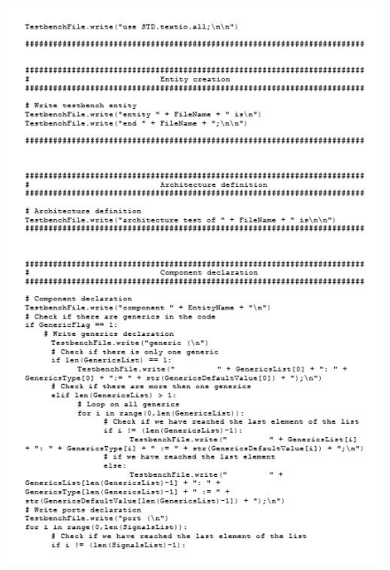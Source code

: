 \begin{figure}[!htb]
	\centering
	\includegraphics[scale=1]{immagini/tbgen3}
	\label{tbgen3}
\end{figure}
